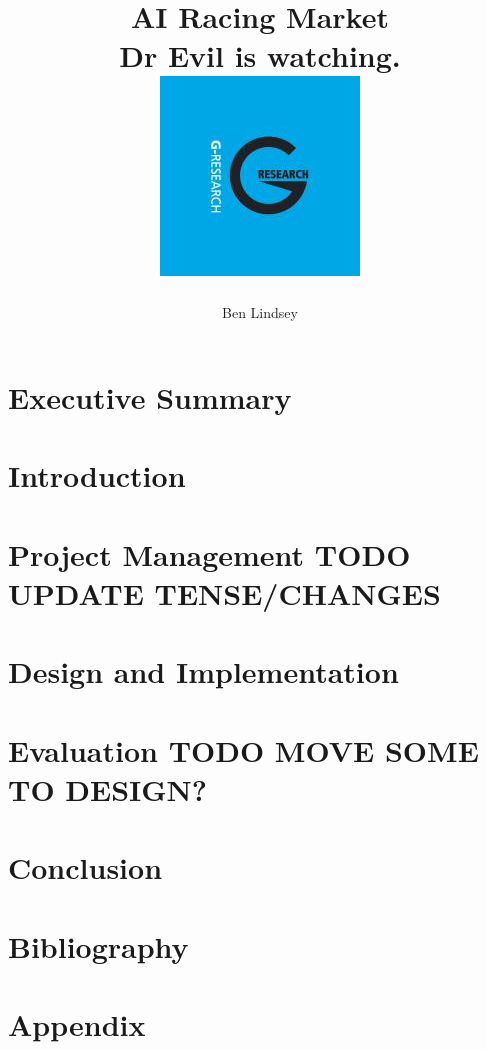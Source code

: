 \documentclass[11pt]{report}
\title{	
  {\huge AI Racing Market}\\
  {\large Dr Evil is watching.}\\[2em]
  {\includegraphics[scale=0.7]{G-Research.jpg}}
}
\author{Ben Lindsey}
\begin{document}
\maketitle

\chapter*{Executive Summary}


\tableofcontents

\chapter{Introduction}


\chapter{Project Management TODO UPDATE TENSE/CHANGES}


\chapter{Design and Implementation}


\chapter{Evaluation TODO MOVE SOME TO DESIGN?}


\chapter{Conclusion}


\chapter{Bibliography}
\printbibliography

\appendix
\chapter{Appendix}

\end{document}
